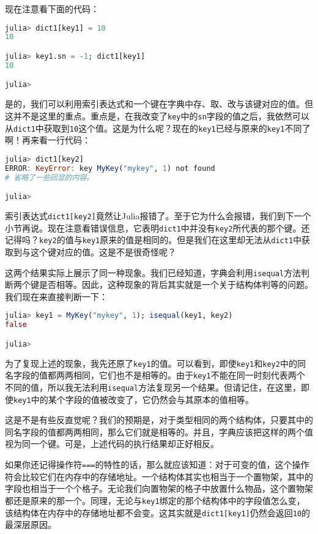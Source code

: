 现在注意看下面的代码：
\begin{lstlisting}[language=julia]
julia> dict1[key1] = 10
10

julia> key1.sn = -1; dict1[key1]
10

julia>
\end{lstlisting}

是的，我们可以利用索引表达式和一个键在字典中存、取、改与该键对应的值。但这并不是这里的重点。重点是，在我改变了\verb`key`中的\verb`sn`字段的值之后，我依然可以从\verb`dict1`中获取到\verb`10`这个值。这是为什么呢？现在的\verb`key1`已经与原来的\verb`key1`不同了啊！再来看一行代码：
\begin{lstlisting}[language=julia]
julia> dict1[key2]
ERROR: KeyError: key MyKey("mykey", 1) not found
# 省略了一些回显的内容。

julia> 
\end{lstlisting}

索引表达式\verb`dict1[key2]`竟然让Julia报错了。至于它为什么会报错，我们到下一个小节再说。现在注意看错误信息，它表明\verb`dict1`中并没有\verb`key2`所代表的那个键。还记得吗？\verb`key2`的值与\verb`key1`原来的值是相同的。但是我们在这里却无法从\verb`dict1`中获取到与这个键对应的值。这是不是很奇怪呢？

这两个结果实际上展示了同一种现象。我们已经知道，字典会利用\verb`isequal`方法判断两个键是否相等。因此，这种现象的背后其实就是一个关于结构体判等的问题。我们现在来直接判断一下：
\begin{lstlisting}[language=julia]
julia> key1 = MyKey("mykey", 1); isequal(key1, key2)
false

julia> 
\end{lstlisting}

为了复现上述的现象，我先还原了\verb`key1`的值。可以看到，即使\verb`key1`和\verb`key2`中的同名字段的值都两两相同，它们也不是相等的。由于\verb`key1`不能在同一时刻代表两个不同的值，所以我无法利用\verb`isequal`方法复现另一个结果。但请记住，在这里，即使\verb`key1`中的某个字段的值被改变了，它仍然会与其原本的值相等。

这是不是有些反直觉呢？我们的预期是，对于类型相同的两个结构体，只要其中的同名字段的值都两两相同，那么它们就是相等的。并且，字典应该把这样的两个值视为同一个键。可是，上述代码的执行结果却正好相反。

如果你还记得操作符\verb`===`的特性的话，那么就应该知道：对于可变的值，这个操作符会比较它们在内存中的存储地址。一个结构体其实也相当于一个置物架，其中的字段也相当于一个个格子。无论我们向置物架的格子中放置什么物品，这个置物架都还是原来的那一个。同理，无论与\verb`key1`绑定的那个结构体中的字段值怎么变，该结构体在内存中的存储地址都不会变。这其实就是\verb`dict1[key1]`仍然会返回\verb`10`的最深层原因。

